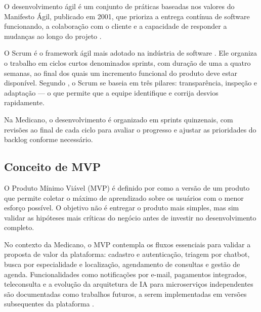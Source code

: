 O desenvolvimento ágil é um conjunto de práticas
baseadas nos valores do Manifesto Ágil, publicado
em 2001, que prioriza a entrega contínua de software
funcionando, a colaboração com o cliente e a
capacidade de responder a mudanças ao longo do
projeto \cite{agilemanifesto2001}.

O Scrum é o framework ágil mais adotado na indústria
de software \cite{schwaber2020}. Ele organiza o
trabalho em ciclos curtos denominados sprints, com
duração de uma a quatro semanas, ao final dos quais
um incremento funcional do produto deve estar
disponível. Segundo , o
Scrum se baseia em três pilares: transparência,
inspeção e adaptação — o que permite que a equipe
identifique e corrija desvios rapidamente.

Na Medicano, o desenvolvimento é organizado em
sprints quinzenais, com revisões ao final de cada
ciclo para avaliar o progresso e ajustar as
prioridades do backlog conforme necessário.

\subsection{Conceito de MVP}
\label{subsec:mvp}

O Produto Mínimo Viável (MVP) é definido por
 como a versão de um produto
que permite coletar o máximo de aprendizado sobre
os usuários com o menor esforço possível. O objetivo
não é entregar o produto mais simples, mas sim
validar as hipóteses mais críticas do negócio antes
de investir no desenvolvimento completo.

No contexto da Medicano, o MVP contempla os fluxos
essenciais para validar a proposta de valor da
plataforma: cadastro e autenticação, triagem por
chatbot, busca por especialidade e localização,
agendamento de consultas e gestão de agenda.
Funcionalidades como notificações por e-mail,
pagamentos integrados, teleconsulta e a evolução
da arquitetura de IA para microserviços independentes
são documentadas como trabalhos futuros, a serem
implementadas em versões subsequentes da plataforma
\cite{ries2011}.
